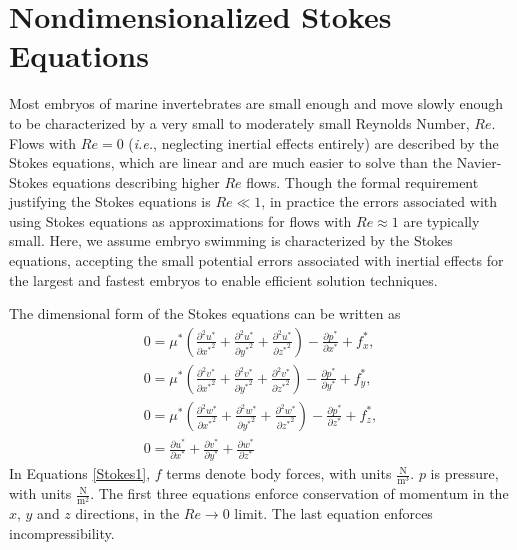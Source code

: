 \documentclass[10pt,a4paper]{article}
\def\non{\nonumber}
\def\p{\partial}
\begin{document}
\section{Nondimensionalized Stokes Equations}\label{NDStokesSect}
Most embryos of marine invertebrates are small enough and move slowly enough to be characterized by a very small to moderately small Reynolds Number, $Re$. 
Flows with $Re = 0$ (\textit{i.e.}, neglecting inertial effects entirely) are described by the Stokes equations, which are linear and are much easier to solve than the Navier-Stokes equations describing higher $Re$ flows.
Though the formal requirement justifying the Stokes equations is $Re \ll 1$, in practice the errors associated with using Stokes equations as approximations for flows with $Re \approx 1$ are typically small.
Here, we assume embryo swimming is characterized by the Stokes equations, accepting the small potential errors associated with inertial effects for the largest and fastest embryos to enable efficient solution techniques.

The dimensional form of the Stokes equations can be written as
\begin{eqnarray}\label{Stokes1}
	0 = \mu^* \left( \frac{\p^2 u^*}{\p {x^*}^2}+\frac{\p^2 u^*}{\p {y^*}^2}+\frac{\p^2 u^*}{\p {z^*}^2} \right) - \frac{\p p^*}{\p {x^*}} + f_x^*, \non \\
	0 = \mu^* \left( \frac{\p^2 v^*}{\p {x^*}^2}+\frac{\p^2 v^*}{\p {y^*}^2}+\frac{\p^2 v^*}{\p {z^*}^2} \right) - \frac{\p p^*}{\p {y^*}} + f_y^*, \non \\
	0 = \mu^* \left( \frac{\p^2 w^*}{\p {x^*}^2}+\frac{\p^2 w^*}{\p {y^*}^2}+\frac{\p^2 w^*}{\p {z^*}^2} \right) - \frac{\p p^*}{\p {z^*}} + f_z^*, \non \\
	0 =  \frac{\p u^*}{\p {x^*}}+\frac{\p v^*}{\p {y^*}}+\frac{\p w^*}{\p {z^*}} 
\end{eqnarray}
In Equations \ref{Stokes1}, $f$ terms denote body forces, with units $\mathrm{\frac{N}{m^3}}$. $p$ is pressure, with units $\mathrm{\frac{N}{m^2}}$.
The first three equations enforce conservation of momentum in the $x$, $y$ and $z$ directions, in the $Re \rightarrow 0$ limit.
The last equation enforces incompressibility.
\end{document}
